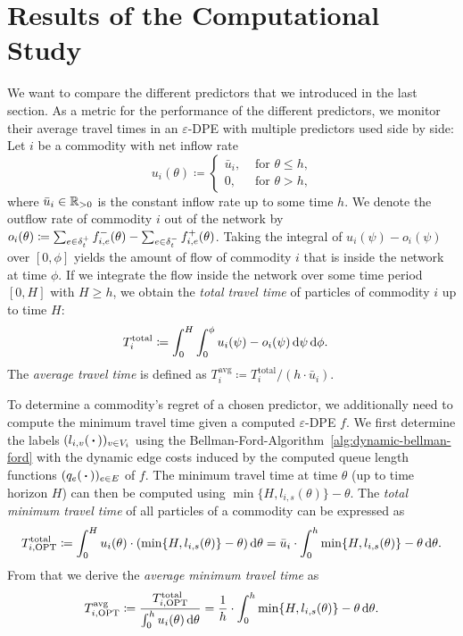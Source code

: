 \section{Results of the Computational Study}

We want to compare the different predictors that we introduced in the last section.
As a metric for the performance of the different predictors, we monitor their average travel times in an $\varepsilon$-DPE with multiple predictors used side by side:
Let $i$ be a commodity with net inflow rate
\[
    u_i(\theta) \coloneqq \begin{cases}
        \bar{u}_i, &\text{ for $\theta \leq h$,}\\
        0, &\text{ for $\theta > h$,}
    \end{cases}
\]
where $\bar{u}_i\in\mathbb{R}_{>0}$ is the constant inflow rate up to some time $h$. 
We denote the outflow rate of commodity $i$ out of the network by  $o_i(\theta) \coloneqq \sum_{e\in\delta^+_{t}} f_{i,e}^-(\theta) - \sum_{e\in\delta^-_{t}} f_{i,e}^+(\theta)$.
Taking the integral of $u_i(\psi) - o_i(\psi)$ over $[0, \phi]$ yields the amount of flow of commodity $i$ that is inside the network at time $\phi$.
If we integrate the flow inside the network over some time period $[0, H]$ with $H \geq h$, we obtain the \emph{total travel time} of particles of commodity $i$ up to time $H$:
\begin{align*}
    T^{\text{total}}_i
    &\coloneqq\int_0^H \int_0^\phi u_i(\psi) - o_{i}(\psi) \,\textnormal{d}\psi \,\textnormal{d} \phi.
\end{align*}
The \emph{average travel time} is defined as $T^{\text{avg}}_i\coloneqq  T_i^{\text{total}} / (h\cdot \bar{u}_i)$.

To determine a commodity's regret of a chosen predictor, we additionally need to compute the minimum travel time given a computed $\varepsilon$-DPE $f$.
We first determine the labels $(l_{i,v}(\,\boldsymbol{\cdot}\,))_{v\in V_i}$ using the Bellman-Ford-Algorithm~\ref{alg:dynamic-bellman-ford} with the dynamic edge costs induced by the computed queue length functions $(q_e(\,\boldsymbol{\cdot}\,))_{e\in E}$ of $f$.
The minimum travel time at time $\theta$ (up to time horizon $H$) can then be computed using $\min\{H, l_{i,s}(\theta)\} - \theta$.
The \emph{total minimum travel time} of all particles of a commodity can be expressed as
\[
    T^{\mathrm{total}}_{i, \text{OPT}}
    \coloneqq \int_0^H u_i(\theta)\cdot (\min\{H, l_{i,s}(\theta)\} - \theta) \,\textnormal{d} \theta
    = \bar u_i \cdot \int_0^h \min\{H, l_{i,s}(\theta)\} - \theta \,\textnormal{d} \theta.
\]
From that we derive the \emph{average minimum travel time} as
\[
    T^{\mathrm{avg}}_{i, \text{OPT}}
    \coloneqq \frac{T^{\mathrm{total}}_{i, \text{OPT}}}{\int_0^h u_i(\theta)\,\textnormal{d} \theta} = \frac{1}{h}\cdot \int_0^h \min\{H, l_{i,s}(\theta)\} - \theta \,\textnormal{d} \theta.
\]

